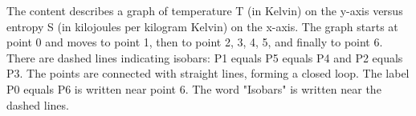 The content describes a graph of temperature T (in Kelvin) on the y-axis versus entropy S (in kilojoules per kilogram Kelvin) on the x-axis. The graph starts at point 0 and moves to point 1, then to point 2, 3, 4, 5, and finally to point 6. There are dashed lines indicating isobars: P1 equals P5 equals P4 and P2 equals P3. The points are connected with straight lines, forming a closed loop. The label P0 equals P6 is written near point 6. The word "Isobars" is written near the dashed lines.